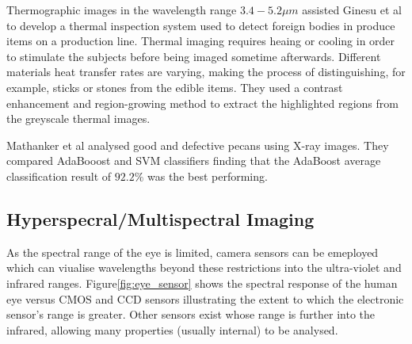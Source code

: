 \documentclass[fleqn,twoside]{article}
\begin{document}
Thermographic images in the wavelength range $3.4-5.2\mu m$ assisted Ginesu et al \cite{ginesu} to develop a thermal inspection system used to detect foreign bodies in produce items on a production line. Thermal imaging requires heaing or cooling in order to stimulate the subjects before being imaged sometime afterwards. Different materials heat transfer rates are varying, making the process of distinguishing, for example, sticks or stones from the edible items. They used a contrast enhancement and region-growing method to extract the highlighted regions from the greyscale thermal images.

Mathanker et al \cite{mathanker} analysed good and defective pecans using X-ray images. They compared AdaBooost and SVM classifiers finding that the AdaBoost average classification result of $92.2\%$ was the best performing.



\subsection{Hyperspecral/Multispectral Imaging}

As the spectral range of the eye is limited, camera sensors can be emeployed which can viualise wavelengths beyond these restrictions into the ultra-violet and infrared ranges. Figure\ref{fig:eye_sensor} shows the spectral response of the human eye versus CMOS and CCD sensors illustrating the extent to which the electronic sensor's range is greater. Other sensors exist whose range is further into the infrared, allowing many properties (usually internal) to be analysed.
\end{document}
